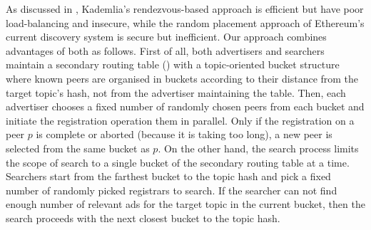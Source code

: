
 As discussed in , Kademlia's rendezvous-based approach is efficient but have poor load-balancing and insecure, while the random placement approach of Ethereum's current discovery system is secure but inefficient. Our approach combines advantages of both as follows. First of all, both advertisers and searchers maintain a secondary routing table () with a topic-oriented bucket structure where known peers are organised in buckets according to their distance from the target topic's hash, not from the advertiser maintaining the table. Then, each advertiser chooses a fixed number of randomly chosen peers from each bucket and initiate the registration operation them in parallel. Only if the registration on a peer $p$ is complete or aborted (because it is taking too long), a new peer is selected from the same bucket as $p$. On the other hand, the search process limits the scope of search to a single bucket of the secondary routing table at a time. Searchers start from the farthest bucket to the topic hash and pick a fixed number of randomly picked registrars to search. If the searcher can not find enough number of relevant ads for the target topic in the current bucket, then the search proceeds with the next closest bucket to the topic hash. 

